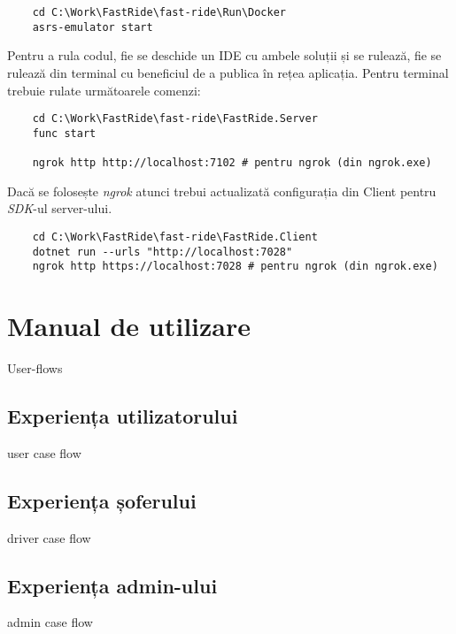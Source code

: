 \begin{verbatim}
    cd C:\Work\FastRide\fast-ride\Run\Docker
    asrs-emulator start
\end{verbatim}

Pentru a rula codul, fie se deschide un IDE cu ambele soluții și se rulează, fie se rulează din terminal
cu beneficiul de a publica în rețea aplicația. Pentru terminal trebuie rulate următoarele comenzi:

\begin{verbatim}
    cd C:\Work\FastRide\fast-ride\FastRide.Server
    func start

    ngrok http http://localhost:7102 # pentru ngrok (din ngrok.exe)
\end{verbatim}

Dacă se folosește \textit{ngrok} atunci trebui actualizată configurația din Client pentru \textit{SDK}-ul server-ului.
\begin{verbatim}
    cd C:\Work\FastRide\fast-ride\FastRide.Client
    dotnet run --urls "http://localhost:7028"
    ngrok http https://localhost:7028 # pentru ngrok (din ngrok.exe)
\end{verbatim}


\section{Manual de utilizare}
User-flows
\subsection{Experiența utilizatorului}
user case flow
\subsection{Experiența șoferului}
driver case flow
\subsection{Experiența admin-ului}
admin case flow